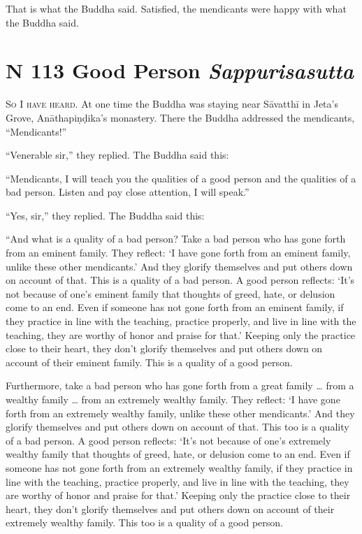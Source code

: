 \documentclass[12pt,openany]{book}%
\newcommand*{\suttatitleacronym}[1]{\smaller[2]{#1}\vspace*{.3em}}
\newcommand*{\suttatitletranslation}[1]{\linebreak{#1}}
\newcommand*{\suttatitleroot}[1]{\linebreak\smaller[2]\itshape{#1}}
\newcommand*{\tocacronym}[1]{\hspace*{-3.3em}{#1}\quad}
\newcommand*{\toctranslation}[1]{#1}
\newcommand*{\tocroot}[1]{(\textit{#1})}
\newcommand*{\scevam}[1]{\textsc{#1}}
\begin{document}
That is what the Buddha said. Satisfied, the mendicants were happy with what the Buddha said. 

%
\section*{{\suttatitleacronym MN 113}{\suttatitletranslation A Good Person }{\suttatitleroot Sappurisasutta}}
\addcontentsline{toc}{section}{\tocacronym{MN 113} \toctranslation{A Good Person } \tocroot{Sappurisasutta}}

\scevam{So I have heard. }At one time the Buddha was staying near \textsanskrit{Sāvatthī} in Jeta’s Grove, \textsanskrit{Anāthapiṇḍika}’s monastery. There the Buddha addressed the mendicants, “Mendicants!” 

“Venerable sir,” they replied. The Buddha said this: 

“Mendicants, I will teach you the qualities of a good person and the qualities of a bad person. Listen and pay close attention, I will speak.” 

“Yes, sir,” they replied. The Buddha said this: 

“And what is a quality of a bad person? Take a bad person who has gone forth from an eminent family. They reflect: ‘I have gone forth from an eminent family, unlike these other mendicants.’ And they glorify themselves and put others down on account of that. This is a quality of a bad person. A good person reflects: ‘It’s not because of one’s eminent family that thoughts of greed, hate, or delusion come to an end. Even if someone has not gone forth from an eminent family, if they practice in line with the teaching, practice properly, and live in line with the teaching, they are worthy of honor and praise for that.’ Keeping only the practice close to their heart, they don’t glorify themselves and put others down on account of their eminent family. This is a quality of a good person. 

Furthermore, take a bad person who has gone forth from a great family … from a wealthy family … from an extremely wealthy family. They reflect: ‘I have gone forth from an extremely wealthy family, unlike these other mendicants.’ And they glorify themselves and put others down on account of that. This too is a quality of a bad person. A good person reflects: ‘It’s not because of one’s extremely wealthy family that thoughts of greed, hate, or delusion come to an end. Even if someone has not gone forth from an extremely wealthy family, if they practice in line with the teaching, practice properly, and live in line with the teaching, they are worthy of honor and praise for that.’ Keeping only the practice close to their heart, they don’t glorify themselves and put others down on account of their extremely wealthy family. This too is a quality of a good person. 
\end{document}

